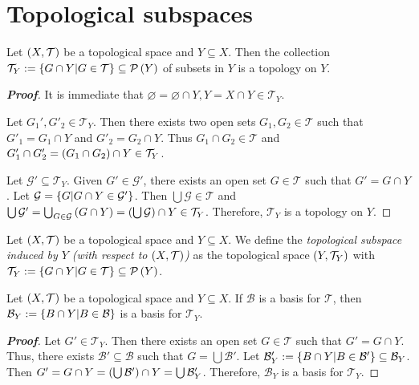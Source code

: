 \section{Topological subspaces}

\begin{proposition}
  Let $\left(X,\mathcal{T}\right)$ be a topological space and $Y\subseteq X$. Then the collection $\mathcal{T}_Y:=\left\{G\cap Y\middle|G\in\mathcal{T}\right\}\subseteq\mathcal{P}\left(Y\right)$ of subsets in $Y$ is a topology on $Y$.
  \begin{proof}[\rm\textbf{Proof}]
    It is immediate that $\varnothing=\varnothing\cap Y,Y=X\cap Y\in\mathcal{T}_Y$. 
    
    Let $G_1',G'_2\in\mathcal{T}_Y$. Then there exists two open sets $G_1,G_2\in\mathcal{T}$ such that $G'_1=G_1\cap Y$ and $G'_2=G_2\cap Y$. Thus $G_1\cap G_2\in\mathcal{T}$ and $G'_1\cap G'_2=\left(G_1\cap G_2\right)\cap Y\in\mathcal{T}_Y$. 
    
    Let $\mathcal{G}'\subseteq\mathcal{T}_Y$. Given $G'\in\mathcal{G}'$, there exists an open set $G\in\mathcal{T}$ such that $G'=G\cap Y$. Let $\mathcal{G}=\left\{G\middle|G\cap Y\in\mathcal{G}'\right\}$. Then $\bigcup{\mathcal{G}}\in\mathcal{T}$ and $\bigcup{\mathcal{G}'}=\bigcup_{G\in\mathcal{G}}{\left(G\cap Y\right)}=\left(\bigcup{\mathcal{G}}\right)\cap Y\in\mathcal{T}_Y$. Therefore, $\mathcal{T}_Y$ is a topology on $Y$.
  \end{proof}
\end{proposition}

\begin{definition}
  Let $\left(X,\mathcal{T}\right)$ be a topological space and $Y\subseteq X$. We define the \emph{topological subspace induced by $Y$ (with respect to $\left(X,\mathcal{T}\right)$)} as the topological space $\left(Y,\mathcal{T}_Y\right)$ with $\mathcal{T}_Y:=\left\{G\cap Y\middle|G\in\mathcal{T}\right\}\subseteq\mathcal{P}\left(Y\right)$.
\end{definition}

\begin{proposition}
  Let $\left(X,\mathcal{T}\right)$ be a topological space and $Y\subseteq X$. If $\mathcal{B}$ is a basis for $\mathcal{T}$, then $\mathcal{B}_Y:=\left\{B\cap Y\middle|B\in\mathcal{B}\right\}$ is a basis for $\mathcal{T}_Y$.
  \begin{proof}[\rm\textbf{Proof}]
    Let $G'\in\mathcal{T}_Y$. Then there exists an open set $G\in\mathcal{T}$ such that $G'=G\cap Y$. Thus, there exists $\mathcal{B}'\subseteq\mathcal{B}$ such that $G=\bigcup{\mathcal{B}'}$. Let $\mathcal{B}'_Y:=\left\{B\cap Y\middle|B\in\mathcal{B}'\right\}\subseteq\mathcal{B}_Y$. Then $G'=G\cap Y=\left(\bigcup{\mathcal{B}'}\right)\cap Y=\bigcup{\mathcal{B}'_Y}$. Therefore, $\mathcal{B}_Y$ is a basis for $\mathcal{T}_Y$.
  \end{proof}
\end{proposition}

